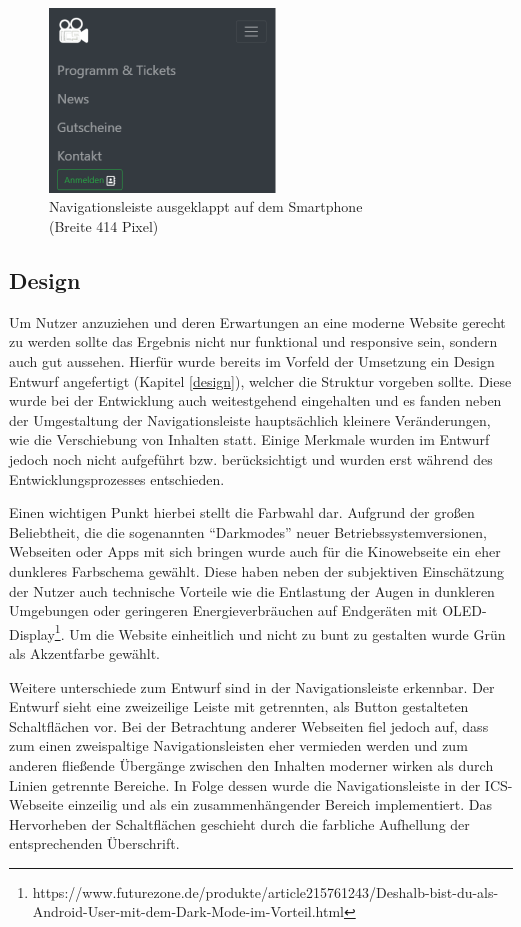	\begin{figure}[H]
		\centering 
		\includegraphics[width=6cm]{img/navLeisteAus.png}
		\captionsetup{format=hang}
		\caption[Navigationsleiste ausgeklappt]{\label{fig:navLeisteAus} Navigationsleiste ausgeklappt auf dem Smartphone \\ (Breite 414 Pixel)}
	\end{figure}

	\subsection{Design} \label{subdesign}
	Um Nutzer anzuziehen und deren Erwartungen an eine moderne Website gerecht zu werden sollte das Ergebnis nicht nur funktional und responsive sein, sondern auch gut aussehen. Hierfür wurde bereits im Vorfeld der Umsetzung ein Design Entwurf angefertigt (Kapitel \vref{design}), welcher die Struktur vorgeben sollte. Diese wurde bei der Entwicklung auch weitestgehend eingehalten und es fanden neben der Umgestaltung der Navigationsleiste hauptsächlich kleinere Veränderungen, wie die Verschiebung von Inhalten statt. Einige Merkmale wurden im Entwurf jedoch noch nicht aufgeführt bzw. berücksichtigt und wurden erst während des Entwicklungsprozesses entschieden. 
	
	
	Einen wichtigen Punkt hierbei stellt die Farbwahl dar. Aufgrund der großen Beliebtheit, die die sogenannten \enquote{Darkmodes} neuer Betriebssystemversionen, Webseiten oder Apps mit sich bringen wurde auch für die Kinowebseite ein eher dunkleres Farbschema gewählt. Diese haben neben der subjektiven Einschätzung der Nutzer auch technische Vorteile wie die Entlastung der Augen in dunkleren Umgebungen oder geringeren Energieverbräuchen auf Endgeräten mit OLED-Display\footnote{https://www.futurezone.de/produkte/article215761243/Deshalb-bist-du-als-Android-User-mit-dem-Dark-Mode-im-Vorteil.html}. Um die Website einheitlich und nicht zu bunt zu gestalten wurde Grün als Akzentfarbe gewählt.
	
	
	Weitere unterschiede zum Entwurf sind in der Navigationsleiste erkennbar. Der Entwurf sieht eine zweizeilige Leiste mit getrennten, als Button gestalteten Schaltflächen vor. Bei der Betrachtung anderer Webseiten fiel jedoch auf, dass zum einen zweispaltige Navigationsleisten eher vermieden werden und zum anderen fließende Übergänge zwischen den Inhalten moderner wirken als durch Linien getrennte Bereiche. In Folge dessen wurde die Navigationsleiste in der \ac{ICS}-Webseite einzeilig und als ein zusammenhängender Bereich implementiert. Das Hervorheben der Schaltflächen geschieht durch die farbliche Aufhellung der entsprechenden Überschrift. 
	
